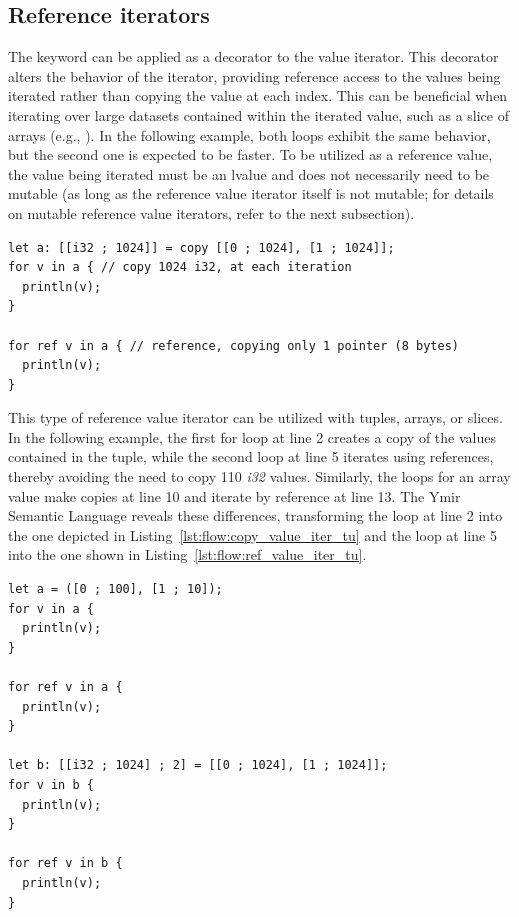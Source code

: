 \subsection{Reference iterators}

The  keyword can be applied as a decorator to the value iterator.
This decorator alters the behavior of the iterator, providing reference access
to the values being iterated rather than copying the value at each index. This
can be beneficial when iterating over large datasets contained within the
iterated value, such as a slice of arrays (e.g., \token{[[c8; 1024]]}). In the
following example, both loops exhibit the same behavior, but the second one is
expected to be faster. To be utilized as a reference value, the value being
iterated must be an lvalue and does not necessarily need to be mutable (as long
as the reference value iterator itself is not mutable; for details on mutable
reference value iterators, refer to the next subsection).

\begin{lstlisting}[style=coloredverbatim, escapechar=@]
let a: [[i32 ; 1024]] = copy [[0 ; 1024], [1 ; 1024]];
for v in a { // copy 1024 i32, at each iteration
  println(v);
}

for ref v in a { // reference, copying only 1 pointer (8 bytes)
  println(v);
}
\end{lstlisting}

This type of reference value iterator can be utilized with tuples, arrays, or
slices. In the following example, the first for loop at line 2 creates a copy of
the values contained in the tuple, while the second loop at line 5 iterates
using references, thereby avoiding the need to copy 110 \textit{i32} values.
Similarly, the loops for an array value make copies at line 10 and iterate by
reference at line 13. The Ymir Semantic Language reveals these differences,
transforming the loop at line 2 into the one depicted in
Listing~\ref{lst:flow:copy_value_iter_tu} and the loop at line 5 into the one shown
in Listing~\ref{lst:flow:ref_value_iter_tu}.

\begin{lstlisting}[style=coloredverbatim, caption=iteration using reference value iterator, label=lst:flow:ref_value_iter_ex]
let a = ([0 ; 100], [1 ; 10]);
for v in a {
  println(v);
}

for ref v in a {
  println(v);
}

let b: [[i32 ; 1024] ; 2] = [[0 ; 1024], [1 ; 1024]];
for v in b {
  println(v);
}

for ref v in b {
  println(v);
}
\end{lstlisting}

